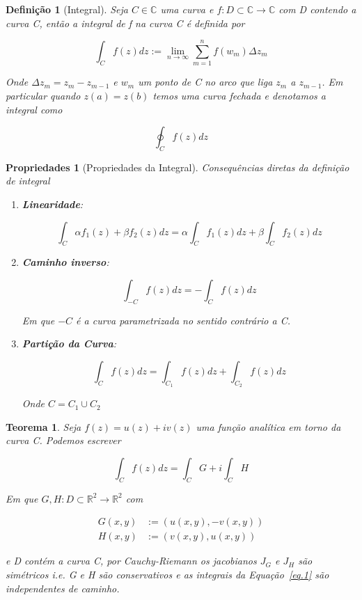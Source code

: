 \documentclass{article}
\newtheorem{prop}{Propriedades}
\newtheorem{theorem}{Teorema}
\newtheorem{definition}{Definição}
\begin{document}
\begin{definition}[Integral]
Seja $C \in \mathbb{C}$ uma curva e $f: D \subset \mathbb{C} \rightarrow \mathbb{C}$ com D contendo a curva C, então a integral de f na curva C é definida por

$$\int_C f(z) d z := \lim_{n \rightarrow \infty} \sum_{m=1}^n f(w_m) \Delta z_m$$

Onde $\Delta z_m = z_m - z_{m - 1}$ e $w_m$ um ponto de C no arco que liga $z_m$ a $z_{m - 1}$. Em particular quando $z(a) = z(b)$ temos uma curva fechada e denotamos a integral como

$$\oint_C f(z) d z$$
\end{definition}

\begin{prop}[Propriedades da Integral] Consequências diretas da definição de integral

\begin{enumerate}
    \item \textbf{Linearidade}:
    
    $$\int_C \alpha  f_1(z) + \beta f_2(z) d z = \alpha \int_C f_1(z) d z + \beta \int_C f_2(z) d z$$
    
    \item \textbf{Caminho inverso}:
    
    $$\int_{-C} f(z) d z = - \int_{C} f(z) d z$$
    
    Em que $-C$ é a curva parametrizada no sentido contrário a C.
    
    \item \textbf{Partição da Curva}:
    
    $$\int_C f(z) d z = \int_{C_1} f(z) d z + \int_{C_2} f(z) d z$$
    
    Onde $C = C_1 \cup C_2$
\end{enumerate}
\end{prop}

\begin{theorem}
Seja $f(z) = u(z) + i v(z)$ uma função analítica em torno da curva C. Podemos escrever

\begin{equation}\label{eq.1}
    \int_C f(z) dz = \int_C G + i \int_C H
\end{equation}

Em que $G,H: D \subset \mathbb{R}^2 \rightarrow \mathbb{R}^2$ com

\begin{align*}
    G(x, y) &:= (u(x, y), - v(x, y)) \\
    H(x, y) &:= (v(x, y), u(x, y))
\end{align*}

e D contém a curva C, por Cauchy-Riemann os jacobianos $J_G$ e $J_H$ são simétricos i.e. G e H são conservativos e as integrais da Equação~\ref{eq.1} são independentes de caminho.
\end{theorem}
\end{document}
